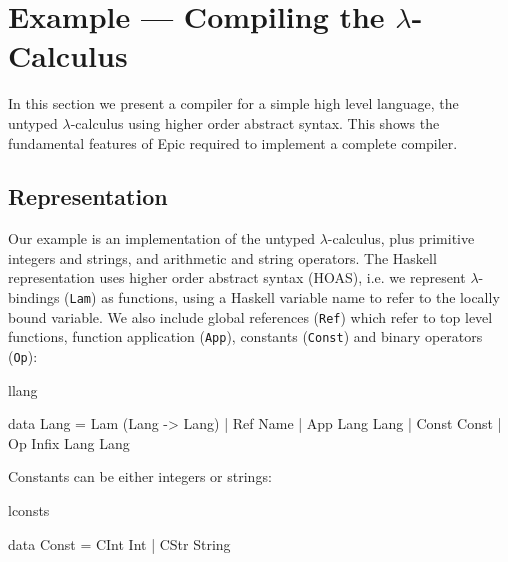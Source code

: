 \section{Example --- Compiling the $\lambda$-Calculus}

\label{sec:lc}

In this section we present a compiler for a simple high level
language, the untyped $\lambda$-calculus using higher order abstract
syntax. This shows the fundamental features of Epic required to
implement a complete compiler.


\subsection{Representation}

Our example is an implementation of the untyped
$\lambda$-calculus, plus primitive integers and strings, and
arithmetic and string operators. The Haskell representation uses
higher order abstract syntax (HOAS), i.e. we
represent $\lambda$-bindings (\texttt{Lam}) as functions,
using a Haskell variable name to refer to the locally bound
variable. We also include global references (\texttt{Ref}) which refer
to top level functions, function application (\texttt{App}), constants
(\texttt{Const}) and binary operators (\texttt{Op}):

\begin{SaveVerbatim}{llang}

data Lang = Lam (Lang -> Lang)
          | Ref Name
          | App Lang Lang
          | Const Const
          | Op Infix Lang Lang

\end{SaveVerbatim}

\noindent
Constants can be either integers or strings:

\begin{SaveVerbatim}{lconsts}

data Const = CInt Int | CStr String

\end{SaveVerbatim}

